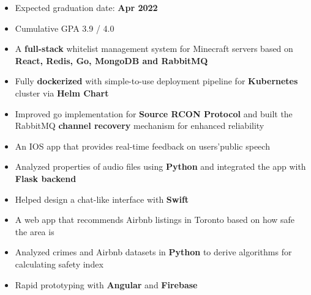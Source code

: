 
\begin{itemize}
\item Expected graduation date: \textbf{Apr 2022}
\item Cumulative GPA 3.9 \// 4.0 
\end{itemize}


\vspace{-2mm}
\begin{itemize}
 \item A \textbf{full-stack} whitelist management system for Minecraft servers based on \textbf{React, Redis, Go, MongoDB and RabbitMQ}
 \item Fully \textbf{dockerized} with simple-to-use deployment pipeline for \textbf{Kubernetes} cluster via \textbf{Helm Chart}
 \item Improved go implementation for \textbf{Source RCON Protocol}  and built the RabbitMQ \textbf{channel recovery} mechanism for enhanced reliability
 
\end{itemize}
\divider
\vspace{-2mm}
\vspace{-1mm}
\begin{itemize}
\item An IOS app that provides real-time feedback on users\rq  \space public speech
\item Analyzed properties of audio files using \textbf{Python} and integrated the app with \textbf{Flask backend}
\item Helped design a chat-like interface with \textbf{Swift}
\end{itemize}
\vspace{-2mm}
\divider
\vspace{-2mm}
\vspace{-3mm}
\begin{itemize}
\item A web app that recommends
Airbnb listings in Toronto based on how
safe the area is
\item  Analyzed crimes and Airbnb
datasets in \textbf{Python} to derive algorithms for
calculating safety index
\item Rapid prototyping with \textbf{Angular} and \textbf{Firebase}
\end{itemize}


